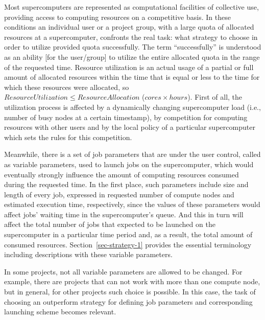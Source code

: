 Most supercomputers are represented as computational facilities of collective
use, providing access to computing resources on a competitive basis.
In these conditions an individual user or a project group, with a large quota
of allocated resources at a supercomputer, confronts the real task: what
strategy to choose in order to utilize provided quota successfully.
The term ``successfully'' is understood as an ability [for the user/group] to
utilize the entire allocated quota in the range of the requested time.
Resource utilization is an actual usage of a partial or full amount of
allocated resources within the time that is equal or less to the time for which
these resources were allocated, so $ResourceUtilization \leq ResourceAllocation$
($cores \times hours$).
First of all, the utilization process is affected by a dynamically changing
supercomputer load (i.e., number of busy nodes at a certain timestamp), by
competition for computing resources with other users and by the local policy of
a particular supercomputer which sets the rules for this competition.

Meanwhile, there is a set of job parameters that are under the user control,
called as variable parameters, used to launch jobs on the supercomputer, which
would eventually strongly influence the amount of computing resources consumed
during the requested time.
In the first place, such parameters include size and length of every job,
expressed in requested number of compute nodes and estimated execution time,
respectively, since the values of these parameters would affect jobs' waiting
time in the supercomputer's queue.
And this in turn will affect the total number of jobs that expected to be
launched on the supercomputer in a particular time period and, as a result, the
total amount of consumed resources.
Section~\ref{sec-strategy-1} provides the essential terminology
including descriptions with these variable parameters.


In some projects, not all variable parameters are allowed to be changed.
For example, there are projects that can not work with more than one compute
node, but in general, for other projects such choice is possible.
In this case, the task of choosing an outperform strategy for defining job
parameters and corresponding launching scheme becomes relevant.


